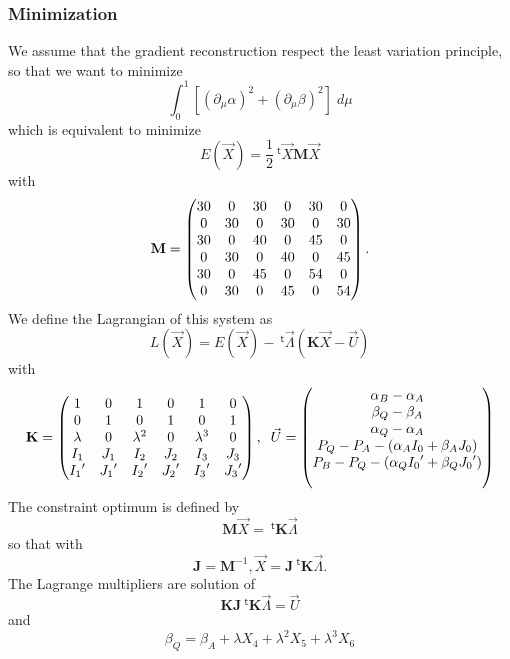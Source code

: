 \documentclass[11pt]{amsart}
\newcommand{\myvec}[1]{\overrightarrow{#1}}
\newcommand{\mygrad}{\vec{\nabla}}
\newcommand{\mymat}[1]{\mathbf{#1}}
\newcommand{\mytrn}[1]{{\!\!~^{\mathsf{t}}{#1}}}
\begin{document}
\subsubsection{Minimization}
We assume that the gradient reconstruction respect the least variation principle,
so that we want to minimize
\[
	\int_0^1 \left[ \left(\partial_\mu\alpha\right)^2 + \left(\partial_\mu\beta\right)^2\right] \; d\mu
\]
which is equivalent to minimize
\[
	E(\vec{X}) = \frac{1}{2} \mytrn{\vec{X}} \mymat{M} \vec{X}
\]
with
\[\mymat{M}=\begin{pmatrix}30 & 0 & 30 & 0 & 30 & 0\cr 0 & 30 & 0 & 30 & 0 & 30\cr 30 & 0 & 40 & 0 & 45 & 0\cr 0 & 30 & 0 & 40 & 0 & 45\cr 30 & 0 & 45 & 0 & 54 & 0\cr 0 & 30 & 0 & 45 & 0 & 54\end{pmatrix}.
\]
We define the Lagrangian of this system as
\[
	L(\vec{X}) = E(\vec{X}) - \mytrn{\vec{\Lambda}} \left( \mymat{K}\vec{X} - \vec{U}\right)
\]
with
\[
	\mymat{K} =
	\begin{pmatrix}
	1 & 0 & 1 & 0 & 1 & 0\cr
	0 & 1 & 0 & 1 & 0 & 1\cr
	\lambda & 0 & \lambda^2 & 0 & \lambda^3 & 0\cr
	I_1 & J_1 & I_2 & J_2 & I_3 & J_3\cr
	{I_1}' & {J_1}' & {I_2}' & {J_2}' & {I_3}' & {J_3}'\cr
	\end{pmatrix},\;\;
	\vec{U} =
	\begin{pmatrix}
	\alpha_B - \alpha_A \cr
	\beta_Q  - \beta_A  \cr
	\alpha_Q - \alpha_A \cr
	P_Q-P_A -( \alpha_A I_0    + \beta_A J_0)\cr
	P_B-P_Q -( \alpha_Q {I_0}' + \beta_Q {J_0}')\cr \cr
	\end{pmatrix}
\]
The constraint optimum is defined by
\[
	\mymat{M}\vec{X} = \mytrn{\mymat{K}} \vec{\Lambda}
\]
so that with
\[
	\mymat{J} = \mymat{M}^{-1}, \vec{X} = \mymat{J}\mytrn{\mymat{K}} \vec{\Lambda}.
\]
The Lagrange multipliers are solution of
\[
	 \mymat{K}\mymat{J}\mytrn{\mymat{K}}\vec{\Lambda} = \vec{U}
\]
and
\[
	\beta_Q = \beta_A + \lambda X_4 + \lambda^2 X_5 + \lambda^3 X_6
\]
\end{document}
